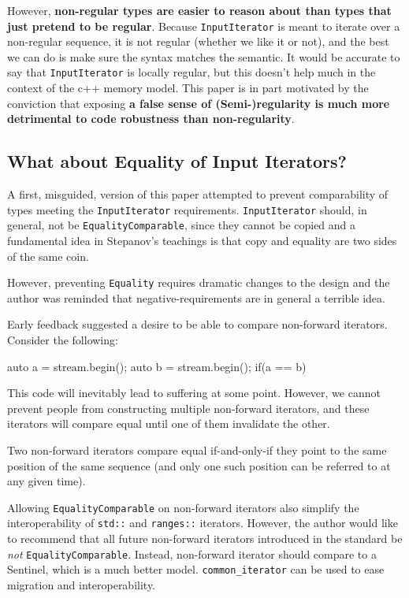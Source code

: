 \documentclass{wg21}
\begin{document}
However, \textbf{non-regular types are easier to reason about than types
	that just pretend to be regular}. Because \texttt{InputIterator} is
meant to iterate over a non-regular sequence, it is not regular (whether
we like it or not), and the best we can do is make sure the syntax
matches the semantic. It would be accurate to say that
\texttt{InputIterator} is locally regular, but this doesn't help much in
the context of the c++ memory model. This paper is in part motivated by
the conviction that exposing \textbf{a false sense of (Semi-)regularity
	is much more detrimental to code robustness than non-regularity}.

\hypertarget{what-about-equality-of-input-iterators}{%
	\subsection{What about Equality of Input
		Iterators?}\label{what-about-equality-of-input-iterators}}

A first, misguided, version of this paper attempted to prevent
comparability of types meeting the \texttt{InputIterator} requirements.
\texttt{InputIterator} should, in general, not be
\texttt{EqualityComparable}, since they cannot be copied and a
fundamental idea in Stepanov's teachings is that copy and equality are
two sides of the same coin.

However, preventing \texttt{Equality} requires dramatic changes to the
design and the author was reminded that negative-requirements are in
general a terrible idea.

Early feedback suggested a desire to be able to compare non-forward
iterators. Consider the following:

\begin{codeblock}
auto a = stream.begin(); 
auto b = stream.begin();
if(a == b) {
}
\end{codeblock}

This code will inevitably lead to suffering at some point. However, we
cannot prevent people from constructing multiple non-forward iterators,
and these iterators will compare equal until one of them invalidate the
other.

Two non-forward iterators compare equal if-and-only-if they point to the
same position of the same sequence (and only one such position can be
referred to at any given time).

Allowing \texttt{EqualityComparable} on non-forward iterators also
simplify the interoperability of \texttt{std::} and \texttt{ranges::}
iterators. However, the author would like to recommend that all future
non-forward iterators introduced in the standard be \emph{not}
\texttt{EqualityComparable}. Instead, non-forward iterator should
compare to a Sentinel, which is a much better model.
\texttt{common\_iterator} can be used to ease migration and
interoperability.
\end{document}
